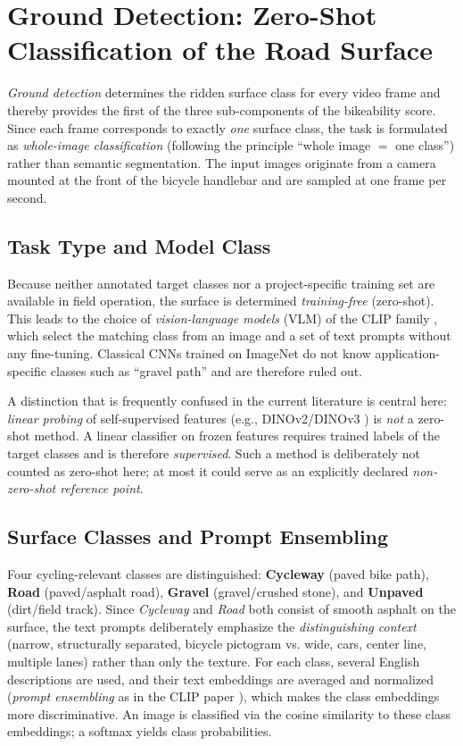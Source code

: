 \documentclass[letterpaper,journal]{IEEEtran}
\begin{document}
\clearpage
\section{Ground Detection: Zero-Shot Classification of the Road Surface}

\emph{Ground detection} determines the ridden surface class for every
video frame and thereby provides the first of the three sub-components
of the bikeability score. Since each frame corresponds to exactly
\emph{one} surface class, the task is formulated as
\emph{whole-image classification} (following the principle
\enquote{whole image $=$ one class}) rather than semantic segmentation.
The input images originate from a camera mounted at the front of the
bicycle handlebar and are sampled at one frame per second.

\subsection{Task Type and Model Class}
Because neither annotated target classes nor a project-specific training
set are available in field operation, the surface is determined
\emph{training-free} (zero-shot). This leads to the choice of
\emph{vision-language models} (VLM) of the CLIP family \cite{clip},
which select the matching class from an image and a set of text prompts
without any fine-tuning. Classical CNNs trained on ImageNet do not know
application-specific classes such as \enquote{gravel path} and are
therefore ruled out.

A distinction that is frequently confused in the current literature is
central here: \emph{linear probing} of self-supervised features
(e.g., DINOv2/DINOv3 \cite{dinov2}) is \emph{not} a zero-shot method.
A linear classifier on frozen features requires trained labels of the
target classes and is therefore \emph{supervised}. Such a method is
deliberately not counted as zero-shot here; at most it could serve as an
explicitly declared \emph{non-zero-shot reference point}.

\subsection{Surface Classes and Prompt Ensembling}
Four cycling-relevant classes are distinguished:
\textbf{Cycleway} (paved bike path), \textbf{Road}
(paved/asphalt road), \textbf{Gravel} (gravel/crushed stone), and
\textbf{Unpaved} (dirt/field track). Since \emph{Cycleway} and
\emph{Road} both consist of smooth asphalt on the surface, the text
prompts deliberately emphasize the \emph{distinguishing context}
(narrow, structurally separated, bicycle pictogram vs. wide, cars,
center line, multiple lanes) rather than only the texture. For each
class, several English descriptions are used, and their text embeddings
are averaged and normalized (\emph{prompt ensembling} as in the CLIP
paper \cite{clip}), which makes the class embeddings more discriminative.
An image is classified via the cosine similarity to these class
embeddings; a softmax yields class probabilities.
\end{document}
